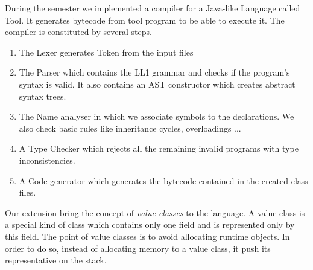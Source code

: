 During the semester we implemented a compiler for a Java-like Language called Tool. It generates bytecode from tool program to be able to execute it. \newline
The compiler is constituted by several steps.

\begin{enumerate}
\item The Lexer generates Token from the input files
\item The Parser which contains the LL1 grammar and checks if the program's syntax is valid. It also contains an AST constructor which creates abstract syntax trees.
\item The Name analyser in which we associate symbols to the declarations. We also check basic rules like inheritance cycles, overloadings ...
\item A Type Checker which rejects all the remaining invalid programs with type inconsistencies.
\item A Code generator which generates the bytecode contained in the created class files.
\end{enumerate}

Our extension bring the concept of \textit{value classes} to the language. \newline 
A value class is a special kind of class which contains only one field and is represented only by this field. The point of value classes is to avoid allocating runtime objects. In order to do so, instead of allocating memory to a value class, it push its representative on the stack.
